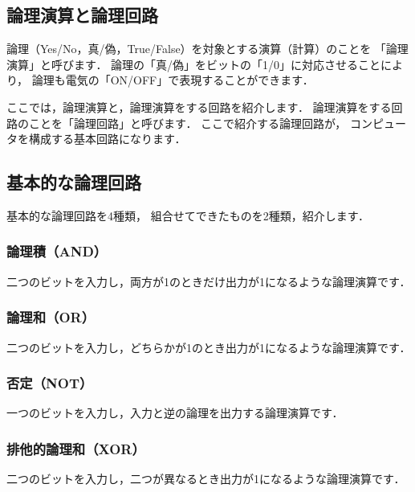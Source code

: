 \subsection{論理演算と論理回路}
\label{logical}

論理（Yes/No，真/偽，True/False）を対象とする演算（計算）のことを
「論理演算」と呼びます．
論理の「真/偽」をビットの「1/0」に対応させることにより，
論理も電気の「ON/OFF」で表現することができます．

ここでは，論理演算と，論理演算をする回路を紹介します．
論理演算をする回路のことを「論理回路」と呼びます．
ここで紹介する論理回路が，
コンピュータを構成する基本回路になります．

\subsection{基本的な論理回路}

基本的な論理回路を4種類，
組合せてできたものを2種類，紹介します．

\subsubsection{論理積（AND）}
二つのビットを入力し，両方が1のときだけ出力が1になるような論理演算です．
\begin{center}
\end{center}

\subsubsection{論理和（OR）}
二つのビットを入力し，どちらかが1のとき出力が1になるような論理演算です．
\begin{center}
\end{center}

\subsubsection{否定（NOT）}
一つのビットを入力し，入力と逆の論理を出力する論理演算です．
\begin{center}
\end{center}

\subsubsection{排他的論理和（XOR）}
二つのビットを入力し，二つが異なるとき出力が1になるような論理演算です．
\begin{center}
\end{center}

